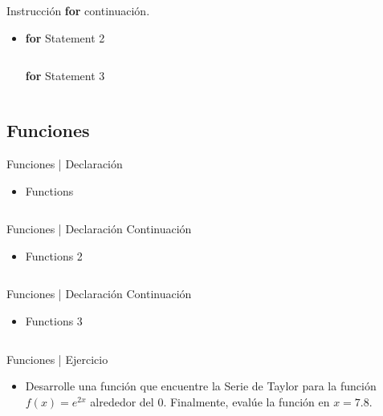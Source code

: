 \documentclass[usenames, dvipsnames, compress]{beamer}
\begin{document}
	\begin{frame}[allowframebreaks]{Instrucción \textbf{for} continuación.}
		\begin{itemize}
		\item [] \begin{block}{\textbf{for} Statement 2}
			\inputminted[xleftmargin=\parindent,linenos]{python}{codes/for_statement2.py}
		\end{block}
			\begin{block}{\textbf{for} Statement 3}
			\inputminted[xleftmargin=\parindent,linenos]{python}{codes/for_statement3.py}
		\end{block}
		\end{itemize}
	\end{frame}
\subsection{Funciones}
	\begin{frame}{Funciones | Declaración}
	\begin{itemize}
		\item \begin{block}{Functions}
			\inputminted[xleftmargin=\parindent,linenos]{python}{codes/decl_functions.py}
		\end{block}
	\end{itemize}
	\end{frame}
	\begin{frame}{Funciones | Declaración Continuación}
	\begin{itemize}
		\item [] \begin{block}{Functions 2}
			\inputminted[xleftmargin=\parindent,linenos]{python}{codes/decl_functions2.py}
		\end{block}
	\end{itemize}
	\end{frame}
	\begin{frame}{Funciones | Declaración Continuación}
	\begin{itemize}
		\item [] \begin{block}{Functions 3}
			\inputminted[xleftmargin=\parindent,linenos]{python}{codes/decl_functions3.py}
		\end{block}
	\end{itemize}
	\end{frame}
	\begin{frame}{Funciones | Ejercicio}
		\begin{itemize}
			\item Desarrolle una función que encuentre la Serie de Taylor para la función $f(x) = e^{2x}$ alrededor del $0$. Finalmente, evalúe la función en $x = 7.8$. 
		\end{itemize}
	\end{frame}
\end{document}
